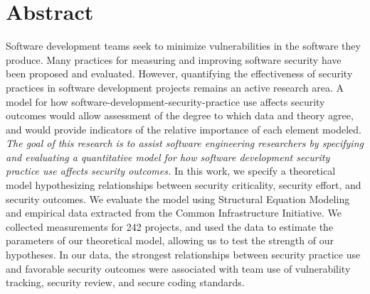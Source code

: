 \section{Abstract}
\label{sec:abstract}

Software development teams seek to minimize vulnerabilities in the software they produce. Many practices for measuring and improving software security have been proposed and evaluated.  However, quantifying the effectiveness of security practices in software development projects remains an active research area. A model for how software-development-security-practice use affects security outcomes would allow assessment of the degree to which data and theory agree, and would provide indicators of the relative importance of each element modeled. \textit{The goal of this research is to assist software engineering researchers by specifying and evaluating a quantitative model for how software development security practice use affects security outcomes.} In this work, we specify a theoretical model hypothesizing relationships between security criticality, security effort, and security outcomes.  We evaluate the model using Structural Equation Modeling and empirical data extracted from the Common Infrastructure Initiative. We collected measurements for 242 projects,  and used the data to estimate the parameters of our theoretical model, allowing us to test the strength of our hypotheses. In our data, the strongest relationships between security practice use and favorable security outcomes were associated with team use of vulnerability tracking, security review, and secure coding standards. 


